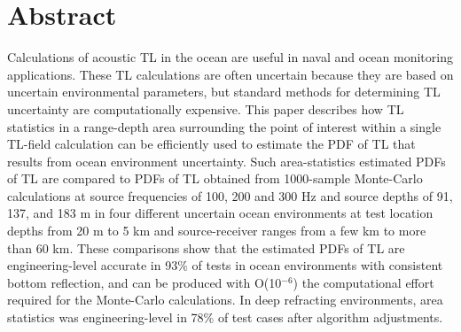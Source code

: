 \section{Abstract}
Calculations of acoustic \ac{TL} in the ocean are useful in naval and
ocean monitoring applications. These \ac{TL} calculations are often
uncertain because they are based on uncertain environmental
parameters, but standard methods for determining \ac{TL} uncertainty
are computationally expensive. This paper describes how \ac{TL}
statistics in a range-depth area surrounding the point of interest
within a single \ac{TL}-field calculation can be efficiently used to
estimate the \ac{PDF} of \ac{TL} that results from ocean environment
uncertainty. Such area-statistics estimated \acp{PDF} of \ac{TL} are
compared to PDFs of \ac{TL} obtained from 1000-sample Monte-Carlo
calculations at source frequencies of 100, 200 and 300 Hz and source
depths of 91, 137, and 183 m in four different uncertain ocean
environments at test location depths from 20 m to 5 km and
source-receiver ranges from a few km to more than 60 km. These
comparisons show that the estimated \acp{PDF} of \ac{TL} are
engineering-level accurate in 93\% of tests in ocean environments with
consistent bottom reflection, and can be produced with O(10$^{-6}$)
the computational effort required for the Monte-Carlo calculations. In
deep refracting environments, area statistics was engineering-level in
78\% of test cases after algorithm adjustments.

